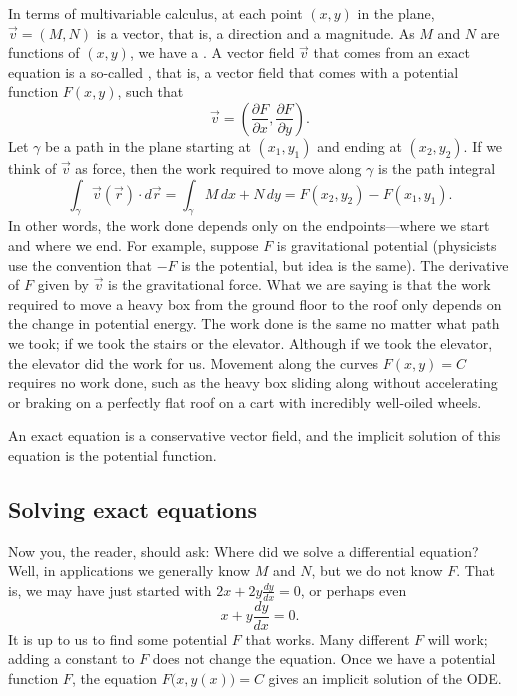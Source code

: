 In terms of multivariable calculus, at each point $(x,y)$ in the plane,
$\vec{v} = (M,N)$ is
a vector, that is, a direction and a magnitude.
As $M$ and $N$ are functions of $(x,y)$, we have a \emph{}.
A vector field $\vec{v}$ that comes from an exact equation is a so-called
\emph{}, that is, a vector field that comes with a
potential function $F(x,y)$, such that
\begin{equation*}
\vec{v} = \left( \frac{\partial F}{\partial x} ,\frac{\partial F}{\partial
y} \right) .
\end{equation*}
Let
$\gamma$ be a path in the plane starting at $(x_1,y_1)$ and ending at
$(x_2,y_2)$.
If we think of $\vec{v}$ as force, then the work required to
move along $\gamma$ is the path integral
\begin{equation*}
\int_\gamma \vec{v}(\vec{r}) \cdot d\vec{r}
=
\int_\gamma M \, dx + N \, dy
=
F(x_2,y_2) - F(x_1,y_1) .
\end{equation*}
In other words, the work done depends only on
the endpoints---where we start and where we end.
For example, suppose $F$ is gravitational potential
(physicists use the convention that $-F$ is the potential,
but idea is the same).
The derivative of $F$ given by $\vec{v}$ is the gravitational force.
What we
are saying is that the work required to move a heavy box from the ground
floor to the roof only depends on the change in potential energy.
The work done is the same
no matter what path we took; if we took the stairs or the elevator.
Although if we took the elevator, the elevator did the work for us.
Movement along the curves $F(x,y) = C$ requires no work done, such as
the heavy box sliding along without accelerating or braking on a perfectly
flat roof on a cart with incredibly well-oiled wheels.

An exact equation is a conservative vector field, and the implicit
solution of this equation is the potential function.

\subsection{Solving exact equations}

Now you, the reader, should ask: Where did we solve a differential equation?
Well, in applications we generally know $M$ and $N$, but we do not
know $F$.  That is, we may have just started with
$2x + 2y \frac{dy}{dx} = 0$, or perhaps even
\begin{equation*}
x + y \frac{dy}{dx} = 0 .
\end{equation*}
It is up to us to find some potential $F$ that works.  Many different $F$
will work; adding a constant to $F$ does not change the equation.
Once we have a potential function $F$, the equation 
$F\bigl(x,y(x)\bigr) = C$
gives an implicit solution of the ODE\@.

